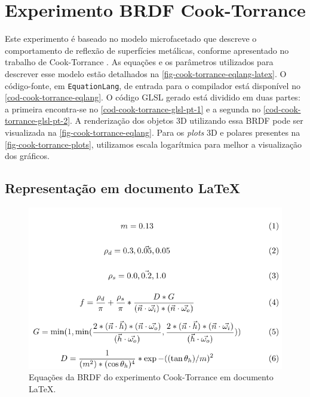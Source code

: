 
\section{Experimento BRDF Cook-Torrance}\label{sec:cook-torrance}


Este experimento é baseado no modelo microfacetado que descreve o comportamento de reflexão de superfícies metálicas, conforme apresentado no trabalho de Cook-Torrance \cite{cook1982reflectance}. As equações e os parâmetros utilizados para descrever esse modelo estão detalhados na \autoref{fig-cook-torrance-eqlang-latex}. O código-fonte, em \texttt{EquationLang}, de entrada para o compilador está disponível no \autoref{cod-cook-torrance-eqlang}. O código GLSL gerado está dividido em duas partes: a primeira encontra-se no \autoref{cod-cook-torrance-glsl-pt-1} e a segunda no \autoref{cod-cook-torrance-glsl-pt-2}. A renderização dos objetos 3D utilizando essa BRDF pode ser visualizada na \autoref{fig-cook-torrance-eqlang}. Para os \textit{plots} 3D e polares presentes na \autoref{fig-cook-torrance-plots}, utilizamos escala logarítmica para melhor a visualização dos gráficos.
\subsection{Representação em documento \LaTeX{}}
\begin{figure}[H]
    \caption{\label{fig-cook-torrance-eqlang-latex} \small Equações da BRDF do experimento Cook-Torrance em documento \LaTeX{}.}
    \begin{center}
        \includegraphics[scale=0.92]{./Imagens/brdfs/cook-torrance.pdf}
    \end{center}
\end{figure}

